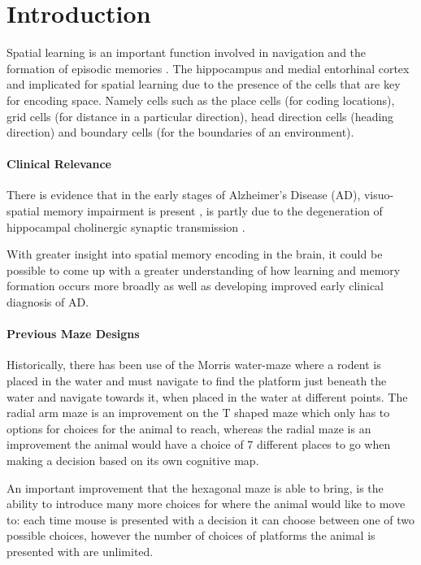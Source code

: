 \section{Introduction}

Spatial learning is an important function involved in navigation and the formation of episodic memories \cite{spatial_learning_memory}.
The hippocampus and medial entorhinal cortex and implicated for spatial learning due to the presence of the cells that are key for encoding space. Namely cells such as the place cells (for coding locations), grid cells (for distance in a particular direction), head direction cells (heading direction) and boundary cells (for the boundaries of an environment).

\paragraph{Clinical Relevance}

There is evidence that in the early stages of Alzheimer's Disease (AD), visuo-spatial memory impairment is present \cite{Diagnosis}, is partly due to the degeneration of hippocampal cholinergic synaptic transmission \cite{Impairments}.


With greater insight into spatial memory encoding in the brain, it could be possible to come up with a greater understanding of how learning and memory formation occurs more broadly as well as developing improved early clinical diagnosis of AD.

\paragraph{Previous Maze Designs}

Historically, there has been use of the Morris water-maze \cite{morris_water_maze} where a rodent is placed in the water and must navigate to find the platform just beneath the water and navigate towards it, when placed in the water at different points.
The radial arm maze \cite{radial_arm_maze} is an improvement on the T shaped maze \cite{t-maze} which only has to options for choices for the animal to reach, whereas the radial maze is an improvement the animal would have a choice of 7 different places to go when making a decision based on its own cognitive map.

An important improvement that the hexagonal maze is able to bring, is the ability to introduce many more choices for where the animal would like to move to: each time mouse is presented with a decision it can choose between one of two possible choices, however the number of choices of platforms the animal is presented with are unlimited.

